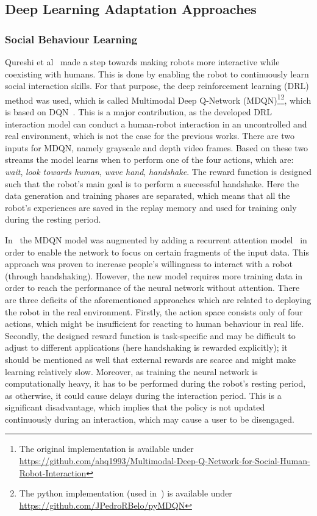 \documentclass[thesis]{mas_proposal}
\begin{document}
\subsection{Deep Learning Adaptation Approaches}

\subsubsection{Social Behaviour Learning}
Qureshi et al~\cite{Qureshi2016} made a step towards making robots more interactive while coexisting with humans. This is done by enabling the robot to continuously learn social interaction skills. For that purpose, the deep reinforcement learning (DRL) method was used, which is called Multimodal Deep Q-Network (MDQN)\footnote{The original implementation is available under \url{https://github.com/ahq1993/Multimodal-Deep-Q-Network-for-Social-Human-Robot-Interaction}}\footnote{The python implementation (used in~\cite{Belo2021}) is available under \url{https://github.com/JPedroRBelo/pyMDQN}}, which is based on DQN~\cite{mnih2015human}. This is a major contribution, as the developed DRL interaction model can conduct a human-robot interaction in an uncontrolled and real environment, which is not the case for the previous works. There are two inputs for MDQN, namely grayscale and depth video frames. Based on these two streams the model learns when to perform one of the four actions, which are: \emph{wait}, \emph{look towards human}, \emph{wave hand}, \emph{handshake}. The reward function is designed such that the robot's main goal is to perform a successful handshake. Here the data generation and training phases are separated, which means that all the robot's experiences are saved in the replay memory and used for training only during the resting period. 

In~\cite{Qureshi2017} the MDQN model was augmented by adding a recurrent attention model~\cite{sorokin2015deep} in order to enable the network to focus on certain fragments of the input data. This approach was proven to increase people's willingness to interact with a robot (through handshaking). However, the new model requires more training data in order to reach the performance of the neural network without attention. There are three deficits of the aforementioned approaches which are related to deploying the robot in the real environment. Firstly, the action space consists only of four actions, which might be insufficient for reacting to human behaviour in real life. Secondly, the designed reward function is task-specific and may be difficult to adjust to different applications (here handshaking is rewarded explicitly); it should be mentioned as well that external rewards are scarce and might make learning relatively slow. Moreover, as training the neural network is computationally heavy, it has to be performed during the robot's resting period, as otherwise, it could cause delays during the interaction period. This is a significant disadvantage, which implies that the policy is not updated continuously during an interaction, which may cause a user to be disengaged. 
\end{document}
